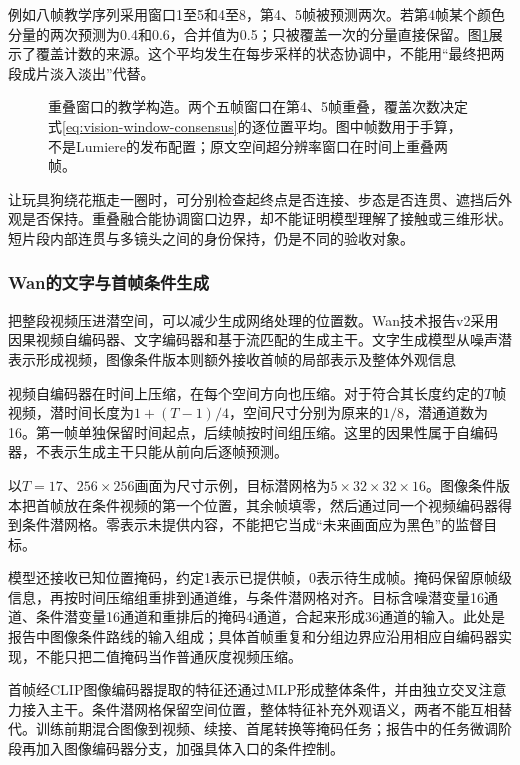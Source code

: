 例如八帧教学序列采用窗口1至5和4至8，第4、5帧被预测两次。若第4帧某个颜色分量的两次预测为0.4和0.6，合并值为0.5；只被覆盖一次的分量直接保留。图\ref{fig:vision-window-consensus}展示了覆盖计数的来源。这个平均发生在每步采样的状态协调中，不能用“最终把两段成片淡入淡出”代替。

\begin{figure}[htbp]
  \centering
  
  \caption{重叠窗口的教学构造。两个五帧窗口在第4、5帧重叠，覆盖次数决定式\eqref{eq:vision-window-consensus}的逐位置平均。图中帧数用于手算，不是Lumiere的发布配置；原文空间超分辨率窗口在时间上重叠两帧。}
  \label{fig:vision-window-consensus}
\end{figure}
\FloatBarrier

让玩具狗绕花瓶走一圈时，可分别检查起终点是否连接、步态是否连贯、遮挡后外观是否保持。重叠融合能协调窗口边界，却不能证明模型理解了接触或三维形状。短片段内部连贯与多镜头之间的身份保持，仍是不同的验收对象。

\Needspace{125mm}
\subsubsection{Wan的文字与首帧条件生成}
\label{sec:vision-multigen-wan}

把整段视频压进潜空间，可以减少生成网络处理的位置数。Wan技术报告v2采用因果视频自编码器、文字编码器和基于流匹配的生成主干。文字生成模型从噪声潜表示形成视频，图像条件版本则额外接收首帧的局部表示及整体外观信息

视频自编码器在时间上压缩，在每个空间方向也压缩。对于符合其长度约定的$T$帧视频，潜时间长度为$1+(T-1)/4$，空间尺寸分别为原来的$1/8$，潜通道数为16。第一帧单独保留时间起点，后续帧按时间组压缩。这里的因果性属于自编码器，不表示生成主干只能从前向后逐帧预测。

以$T=17$、$256\times256$画面为尺寸示例，目标潜网格为$5\times32\times32\times16$。图像条件版本把首帧放在条件视频的第一个位置，其余帧填零，然后通过同一个视频编码器得到条件潜网格。零表示未提供内容，不能把它当成“未来画面应为黑色”的监督目标。

模型还接收已知位置掩码，约定1表示已提供帧，0表示待生成帧。掩码保留原帧级信息，再按时间压缩组重排到通道维，与条件潜网格对齐。目标含噪潜变量16通道、条件潜变量16通道和重排后的掩码4通道，合起来形成36通道的输入。此处是报告中图像条件路线的输入组成；具体首帧重复和分组边界应沿用相应自编码器实现，不能只把二值掩码当作普通灰度视频压缩。

首帧经CLIP图像编码器提取的特征还通过MLP形成整体条件，并由独立交叉注意力接入主干。条件潜网格保留空间位置，整体特征补充外观语义，两者不能互相替代。训练前期混合图像到视频、续接、首尾转换等掩码任务；报告中的任务微调阶段再加入图像编码器分支，加强具体入口的条件控制。

